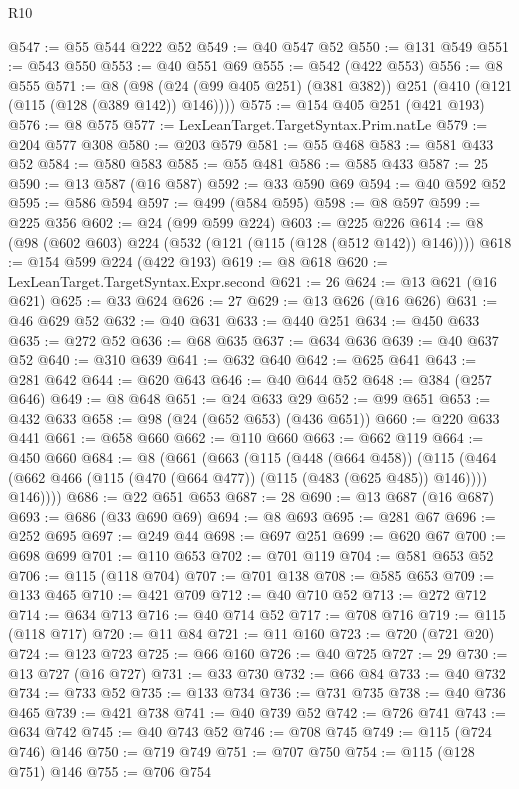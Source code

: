 \begin{lexlean}{R10}
\begin{coremodule}
@547 := @55 @544 @222 @52
@549 := @40 @547 @52
@550 := @131 @549
@551 := @543 @550
@553 := @40 @551 @69
@555 := @542 (@422 @553)
@556 := @8 @555
@571 := @8 (@98 (@24 (@99 @405 @251) (@381 @382)) @251 (@410 (@121 (@115 (@128 (@389 @142)) @146))))
@575 := @154 @405 @251 (@421 @193)
@576 := @8 @575
@577 := LexLeanTarget.TargetSyntax.Prim.natLe
@579 := @204 @577 @308
@580 := @203 @579
@581 := @55 @468
@583 := @581 @433 @52
@584 := @580 @583
@585 := @55 @481
@586 := @585 @433
@587 := 25
@590 := @13 @587 (@16 @587)
@592 := @33 @590 @69
@594 := @40 @592 @52
@595 := @586 @594
@597 := @499 (@584 @595)
@598 := @8 @597
@599 := @225 @356
@602 := @24 (@99 @599 @224)
@603 := @225 @226
@614 := @8 (@98 (@602 @603) @224 (@532 (@121 (@115 (@128 (@512 @142)) @146))))
@618 := @154 @599 @224 (@422 @193)
@619 := @8 @618
@620 := LexLeanTarget.TargetSyntax.Expr.second
@621 := 26
@624 := @13 @621 (@16 @621)
@625 := @33 @624
@626 := 27
@629 := @13 @626 (@16 @626)
@631 := @46 @629 @52
@632 := @40 @631
@633 := @440 @251
@634 := @450 @633
@635 := @272 @52
@636 := @68 @635
@637 := @634 @636
@639 := @40 @637 @52
@640 := @310 @639
@641 := @632 @640
@642 := @625 @641
@643 := @281 @642
@644 := @620 @643
@646 := @40 @644 @52
@648 := @384 (@257 @646)
@649 := @8 @648
@651 := @24 @633 @29
@652 := @99 @651
@653 := @432 @633
@658 := @98 (@24 (@652 @653) (@436 @651))
@660 := @220 @633 @441
@661 := @658 @660
@662 := @110 @660
@663 := @662 @119
@664 := @450 @660
@684 := @8
    (@661
      (@663
        (@115
          (@448 (@664 @458))
          (@115 (@464 (@662 @466 (@115 (@470 (@664 @477)) (@115 (@483 (@625 @485)) @146)))) @146))))
@686 := @22 @651 @653
@687 := 28
@690 := @13 @687 (@16 @687)
@693 := @686 (@33 @690 @69)
@694 := @8 @693
@695 := @281 @67
@696 := @252 @695
@697 := @249 @44
@698 := @697 @251
@699 := @620 @67
@700 := @698 @699
@701 := @110 @653
@702 := @701 @119
@704 := @581 @653 @52
@706 := @115 (@118 @704)
@707 := @701 @138
@708 := @585 @653
@709 := @133 @465
@710 := @421 @709
@712 := @40 @710 @52
@713 := @272 @712
@714 := @634 @713
@716 := @40 @714 @52
@717 := @708 @716
@719 := @115 (@118 @717)
@720 := @11 @84
@721 := @11 @160
@723 := @720 (@721 @20)
@724 := @123 @723
@725 := @66 @160
@726 := @40 @725
@727 := 29
@730 := @13 @727 (@16 @727)
@731 := @33 @730
@732 := @66 @84
@733 := @40 @732
@734 := @733 @52
@735 := @133 @734
@736 := @731 @735
@738 := @40 @736 @465
@739 := @421 @738
@741 := @40 @739 @52
@742 := @726 @741
@743 := @634 @742
@745 := @40 @743 @52
@746 := @708 @745
@749 := @115 (@724 @746) @146
@750 := @719 @749
@751 := @707 @750
@754 := @115 (@128 @751) @146
@755 := @706 @754

\end{coremodule}
\end{lexlean}
